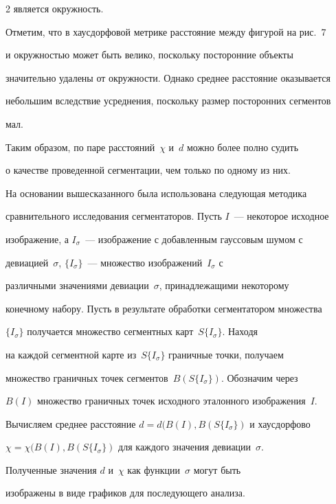 \begin{multicols}{2}
является окружность.








  Отметим, что в хаусдорфовой метрике расстояние между фигурой на рис.~7 


и окружностью может быть велико, поскольку посторонние объекты 


значительно удалены от окружности. Однако среднее расстояние оказывается 


небольшим вследствие усреднения, поскольку размер посторонних сегментов 


мал.


  


  Таким образом, по паре расстояний~$\chi$ и~$d$ можно более полно судить 


о качестве проведенной сегментации, чем только по одному из них.


  


  На основании вышесказанного была использована следующая методика 


сравнительного исследования сегментаторов. Пусть $I$~--- некоторое исход\-ное 


изображение, а $I_\sigma$~--- изображение с до\-бав\-лен\-ным гауссовым шумом с 


девиацией~$\sigma$, $\{I_\sigma\}$~--- множество изображений~$I_\sigma$ с 


различными значениями девиации~$\sigma$, принадлежащими некоторому 


конечному набору. Пусть в результате обработки сегментатором множества 


$\{I_\sigma\}$ получается множество сегментных карт~$S\{I_\sigma\}$. Находя 


на каждой сегментной карте из~$S\{I_\sigma\}$ граничные точки, получаем 


множество граничных точек сегментов~$B(S\{I_\sigma\})$. Обозначим через 


$B(I)$ множество граничных точек исходного эталонного изображения~$I$. 


Вычисляем среднее расстояние $d = d(B(I), B(S\{I_\sigma\})$ и хаусдорфово 


$\chi = \chi(B(I), B(S\{I_\sigma\})$ для каждого значения девиации~$\sigma$. 


Полученные значения $d$ и~$\chi$ как функции~$\sigma$ могут быть 


изображены в виде графиков для последующего анализа.



\end{multicols}
